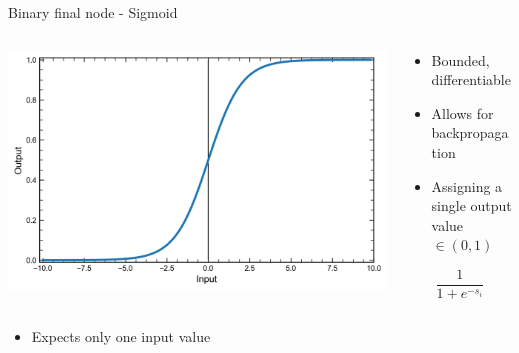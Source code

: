\begin{frame}{Binary final node - Sigmoid}
    \begin{columns}
        \begin{column}{0.65\textwidth}
            \includegraphics[width=\textwidth]{sigmoid}
        \end{column}
        \begin{column}{0.5\textwidth}
            \begin{itemize}
                \item Bounded, differentiable
                \item Allows for backpropagation
                \item Assigning a single output value $\in (0,1)$
            \end{itemize}
            \begingroup
            \large
            \begin{equation*}
                \frac{1}{1+e^{-s_i}}
            \end{equation*}
            \endgroup
        \end{column}
    \end{columns}
    \begin{itemize}
        \color{red}
        \item Expects only one input value
    \end{itemize}
\end{frame}

